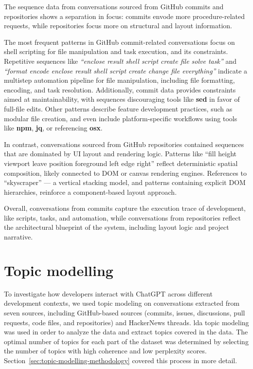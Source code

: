 The sequence data from conversations sourced from GitHub commits and repositories shows a separation in focus: commits envode more procedure-related requests, while repositories focus more on structural and layout information. 

The most frequent patterns in GitHub commit-related conversations focus on shell scripting for file manipulation and task execution, and its constraints. Repetitive sequences like \textit{``enclose result shell script create file solve task''} and \textit{``format encode enclose result shell script create change file everything''} indicate a multistep automation pipeline for file manipulation, including file formatting, encoding, and task resolution. Additionally, commit data provides constraints aimed at maintainability, with sequences discouraging tools like \textbf{sed} in favor of full-file edits. Other patterns describe feature development practices, such as modular file creation, and even include platform-specific workflows using tools like \textbf{npm}, \textbf{jq}, or referencing \textbf{osx}.

In contrast, conversations sourced from GitHub repositories contained sequences that are dominated by UI layout and rendering logic. Patterns like ``fill height viewport leave position foreground left edge right'' reflect deterministic spatial composition, likely connected to DOM or canvas rendering engines. References to ``skyscraper'' --- a vertical stacking model, and patterns containing explicit DOM hierarchies, reinforce a component-based layout approach.

Overall, conversations from commits capture the execution trace of development, like scripts, tasks, and automation, while conversations from repositories reflect the architectural blueprint of the system, including layout logic and project narrative.

\section{Topic modelling}
To investigate how developers interact with ChatGPT across different development contexts, we used topic modeling on conversations extracted from seven sources, including GitHub-based sources (commits, issues, discussions, pull requests, code files, and repositories) and HackerNews \linebreak threads. \Acrfull{lda} topic modeling was used in order to analyze the data and extract topics covered in the data. The optimal number of topics for each part of the dataset was determined by selecting the number of topics with high coherence and low perplexity scores. Section~\ref{sec:topic-modelling-methodology} covered this process in more detail. 

